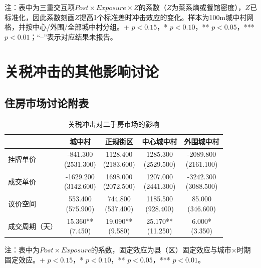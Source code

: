 \documentclass[a4paper,12pt]{report}
\begin{document}
\begin{table}[H]
\par\raggedright{} 注：表中为三重交互项$Post\times Exposure\times Z$的系数（$Z$为菜系熵或餐馆密度），$Z$已标准化，因此系数刻画$Z$提高1个标准差时冲击效应的变化。样本为100m城中村网格，并按中心/外围/全部城中村分组。+ $p<0.15$，* $p<0.10$，** $p<0.05$，*** $p<0.01$；“--”表示对应结果未报告。
\end{table}

\section{关税冲击的其他影响讨论}
\subsection{住房市场讨论附表}
\begin{table}[H]
\centering
\caption{关税冲击对二手房市场的影响}
\label{tab:discuss_housing}
\begin{tabular*}{\textwidth}{@{\extracolsep{\fill}}lcccc}
\toprule
 & 城中村 & 正规街区 & 中心城中村 & 外围城中村 \\
\midrule
挂牌单价 & \makecell{-841.300\\(2531.300)} & \makecell{1128.400\\(2183.600)} & \makecell{1285.300\\(2529.500)} & \makecell{-2089.800\\(2161.100)} \\
成交单价 & \makecell{-1629.200\\(3142.600)} & \makecell{1698.000\\(2072.500)} & \makecell{1207.000\\(2441.300)} & \makecell{-3242.300\\(3088.500)} \\
议价空间 & \makecell{553.400\\(575.900)} & \makecell{744.800\\(537.400)} & \makecell{1185.500\\(928.400)} & \makecell{85.000\\(346.600)} \\
成交周期（天） & \makecell{15.360**\\(7.450)} & \makecell{19.090**\\(9.580)} & \makecell{25.170**\\(11.250)} & \makecell{6.000*\\(3.350)} \\
\bottomrule
\end{tabular*}
\vspace{0.2cm}

\par\raggedright{} 注：表中为$Post\times Exposure$的系数，固定效应为县（区）固定效应与城市$\times$时期固定效应。+ $p<0.15$，* $p<0.10$，** $p<0.05$，*** $p<0.01$。
\end{table}
\end{document}
